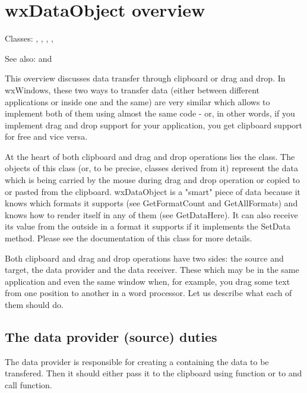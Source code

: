 \section{wxDataObject overview}\label{wxdataobjectoverview}

Classes: ,
 ,
 ,
 ,

See also:  and 

This overview discusses data transfer through clipboard or drag and drop. In
wxWindows, these two ways to transfer data (either between different
applications or inside one and the same) are very similar which allows to
implement both of them using almost the same code - or, in other
words, if you implement drag and drop support for your application, you get
clipboard support for free and vice versa.

At the heart of both clipboard and drag and drop operations lies the 
 class. The objects of this class (or, to
be precise, classes derived from it) represent the data which is being carried
by the mouse during drag and drop operation or copied to or pasted from the
clipboard. wxDataObject is a "smart" piece of data because it knows which
formats it supports (see GetFormatCount and GetAllFormats) and knows how to
render itself in any of them (see GetDataHere). It can also receive its value
from the outside in a format it supports if it implements the SetData method.
Please see the documentation of this class for more details.

Both clipboard and drag and drop operations have two sides: the source and
target, the data provider and the data receiver. These which may be in the same
application and even the same window when, for example, you drag some text from
one position to another in a word processor. Let us describe what each of them
should do.

\subsection{The data provider (source) duties}\label{wxdataobjectsource}

The data provider is responsible for creating a 
 containing the data to be
transfered. Then it should either pass it to the clipboard using 
 function or to 
 and call 
 function.


